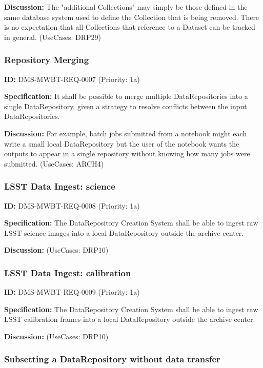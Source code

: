 \documentclass[SE,toc,lsstdraft]{lsstdoc}
\begin{document}
\textbf{Discussion:}
The "additional Collections" may simply be those defined in the same database system used to define the Collection that is being removed. There is no expectation that all Collections that reference to a Dataset can be tracked in general. (UseCases: DRP29)

\subsubsection{Repository Merging}

\label{DMS-MWBT-REQ-0007}
\textbf{ID:} DMS-MWBT-REQ-0007 (Priority: 1a)

\textbf{Specification:}
It shall be possible to merge multiple DataRepositories into a single DataRepository, given a strategy to resolve conflicts between the input DataRepositories.

\textbf{Discussion:}
For example, batch jobs submitted from a notebook might each write a small local DataRepository but the user of the notebook wants the outputs to appear in a single repository without knowing how many jobs were submitted. (UseCases: ARCH4)

\subsubsection{LSST Data Ingest: science}

\label{DMS-MWBT-REQ-0008}
\textbf{ID:} DMS-MWBT-REQ-0008 (Priority: 1a)

\textbf{Specification:}
The DataRepository Creation System shall be able to ingest raw LSST science images into a local DataRepository outside the archive center.

\textbf{Discussion:}
(UseCases: DRP10)

\subsubsection{LSST Data Ingest: calibration}

\label{DMS-MWBT-REQ-0009}
\textbf{ID:} DMS-MWBT-REQ-0009 (Priority: 1a)

\textbf{Specification:}
The DataRepository Creation System shall be able to ingest raw LSST calibration frames into a local DataRepository outside the archive center.

\textbf{Discussion:}
(UseCases: DRP10)

\subsubsection{Subsetting a DataRepository without data transfer}
\end{document}
